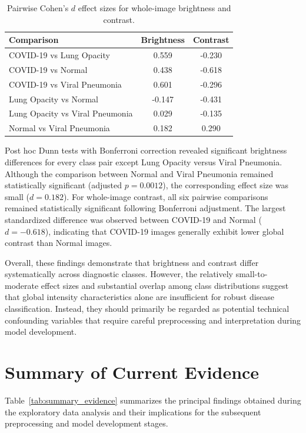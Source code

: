 \begin{table}[H]
\centering
\caption{Pairwise Cohen's $d$ effect sizes for whole-image brightness and contrast.}
\label{tab:cohens_d}
\begin{tabular}{lcc}
\toprule
\textbf{Comparison} & \textbf{Brightness} & \textbf{Contrast} \\
\midrule
COVID-19 vs Lung Opacity            & 0.559  & -0.230 \\
COVID-19 vs Normal                  & 0.438  & -0.618 \\
COVID-19 vs Viral Pneumonia         & 0.601  & -0.296 \\
Lung Opacity vs Normal              & -0.147 & -0.431 \\
Lung Opacity vs Viral Pneumonia     & 0.029  & -0.135 \\
Normal vs Viral Pneumonia           & 0.182  & 0.290 \\
\bottomrule
\end{tabular}
\end{table}

Post hoc Dunn tests with Bonferroni correction revealed significant
brightness differences for every class pair except Lung Opacity versus Viral
Pneumonia. Although the comparison between Normal and Viral Pneumonia remained
statistically significant (adjusted $p = 0.0012$), the corresponding effect
size was small ($d = 0.182$). For whole-image contrast, all six pairwise
comparisons remained statistically significant following Bonferroni
adjustment. The largest standardized difference was observed between
COVID-19 and Normal ($d = -0.618$), indicating that COVID-19 images generally
exhibit lower global contrast than Normal images.

Overall, these findings demonstrate that brightness and contrast differ
systematically across diagnostic classes. However, the relatively small-to-
moderate effect sizes and substantial overlap among class distributions suggest
that global intensity characteristics alone are insufficient for robust disease
classification. Instead, they should primarily be regarded as potential
technical confounding variables that require careful preprocessing and
interpretation during model development.

\section{Summary of Current Evidence}

Table~\ref{tab:summary_evidence} summarizes the principal findings obtained
during the exploratory data analysis and their implications for the subsequent
preprocessing and model development stages.

